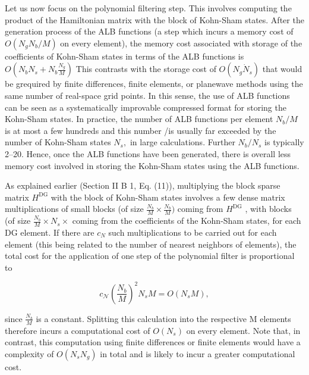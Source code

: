 \documentclass[
  10
]{article}
\begin{document}
Let us now focus on the polynomial filtering step. This involves
computing the product of the Hamiltonian matrix with the block of
Kohn-Sham states. After the generation process of the ALB functions (a
step which incurs a memory cost of \(O ( N _ { g } N _ { b } / M )\) on
every element), the memory cost associated with storage of the
coefficients of Kohn-Sham states in terms of the ALB functions is
\(O \left( N _ { b } N _ { s } + N _ { b } \frac { N _ { g } } { M } \right)\)
This contrasts with the storage cost of
\(O ( N _ { g } \dot { N } _ { s } )\) that would be grequired by finite
differences, finite elements, or planewave methods using the same number
of real-space grid points. In this sense, the use of ALB functions can
be seen as a systematically improvable compressed format for storing the
Kohn-Sham states. In practice, the number of ALB functions per element
\(N _ { b } / M\) is at most a few hundreds and this number /is usually
far exceeded by the number of Kohn-Sham states \(N _ { s } ,\) in large
calculations. Further \(N _ { b } / N _ { s }\) is typically 2--20.
Hence, once the ALB functions have been generated, there is overall less
memory cost involved in storing the Kohn-Sham states using the ALB
functions.

As explained earlier (Section II B 1, Eq. (11)), multiplying the block
sparse matrix \(H ^ { \mathrm { D G } }\) with the block of Kohn-Sham
states involves a few dense matrix multiplications of small blocks (of
size \(\frac { N _ { b } } { M } \times \frac { N _ { b } } { M } )\)
coming from \(H ^ { \mathrm { D G } }\) , with blocks (of size
\(\frac { N _ { b } } { M } \times N _ { s } \times\) coming from the
coefficients of the Kohn-Sham states, for each DG element. If there are
\(c _ { N }\) such multiplications to be carried out for each element
(this being related to the number of nearest neighbors of elements), the
total cost for the application of one step of the polynomial filter is
proportional to

\[
c _ {\mathcal {N}} \left(\frac {N _ {b}}{M}\right) ^ {2} N _ {s} M = O (N _ {s} M), \tag {16}
\]

since \(\frac { N _ { b } } { M }\) is a constant. Splitting this
calculation into the respective M elements therefore incurs a
computational cost of \(O ( N _ { s } )\) on every element. Note that,
in contrast, this computation using finite differences or finite
elements would have a complexity of \(O ( N _ { s } N _ { g } )\) in
total and is likely to incur a greater computational cost.
\end{document}
